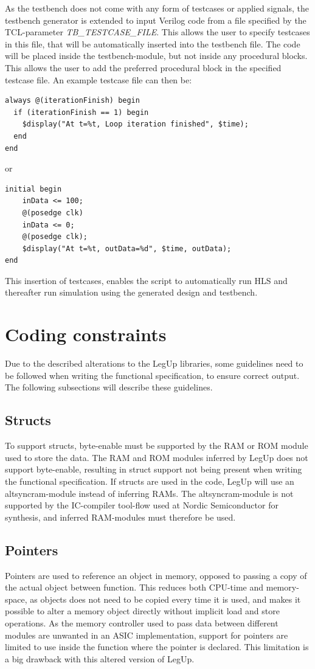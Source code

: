 As the testbench does not come with any form of testcases or applied signals, the testbench generator is extended to input Verilog code from a file specified by the TCL-parameter \textit{TB\_TESTCASE\_FILE}. This allows the user to specify testcases in this file, that will be automatically inserted into the testbench file. The code will be placed inside the testbench-module, but not inside any procedural blocks. This allows the user to add the preferred procedural block in the specified testcase file. An example testcase file can then be:

\lstset{language=Verilog, style=Verilogstyle}
\begin{lstlisting}
always @(iterationFinish) begin
  if (iterationFinish == 1) begin
    $display("At t=%t, Loop iteration finished", $time);
  end
end
\end{lstlisting}
or
\begin{lstlisting}
initial begin
    inData <= 100;
    @(posedge clk)
    inData <= 0;
    @(posedge clk);
    $display("At t=%t, outData=%d", $time, outData);
end
\end{lstlisting}
This insertion of testcases, enables the script to automatically run HLS and thereafter run simulation using the generated design and testbench.

\section{Coding constraints}
Due to the described alterations to the LegUp libraries, some guidelines need to be followed when writing the functional specification, to ensure correct output. The following subsections will describe these guidelines.
\subsection{Structs}
To support structs, byte-enable must be supported by the RAM or ROM module used to store the data. The RAM and ROM modules inferred by LegUp does not support byte-enable, resulting in struct support not being present when writing the functional specification. If structs are used in the code, LegUp will use an altsyncram-module instead of inferring RAMs. The altsyncram-module is not supported by the IC-compiler tool-flow used at Nordic Semiconductor for synthesis, and inferred RAM-modules must therefore be used. 
\subsection{Pointers}
Pointers are used to reference an object in memory, opposed to passing a copy of the actual object between function. This reduces both CPU-time and memory-space, as objects does not need to be copied every time it is used, and makes it possible to alter a memory object directly without implicit load and store operations. As the memory controller used to pass data between different modules are unwanted in an ASIC implementation, support for pointers are limited to use inside the function where the pointer is declared. This limitation is a big drawback with this altered version of LegUp.
